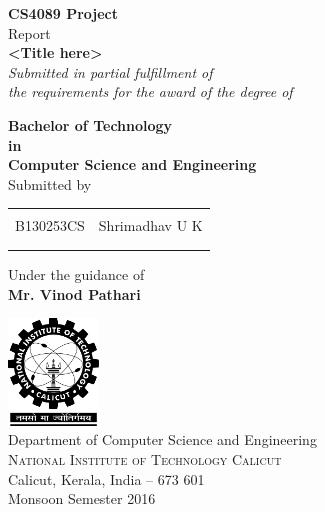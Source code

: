 \begin{titlepage}

\begin{center}

\textup{\small {\bf CS4089 Project} \\ Report}\\[0.2in]

\Large \textbf {<Title here>}\\[0.5in]

       \small \emph{Submitted in partial fulfillment of\\
        the requirements for the award of the degree of}
        \vspace{.2in}

       {\bf Bachelor of Technology \\in\\ Computer Science and Engineering}\\[0.5in]

\normalsize Submitted by \\
\begin{table}[h]
\centering
\begin{tabular}{lr}\hline \\
B130253CS & Shrimadhav U K \\ \\ \hline
\\
\end{tabular}
\end{table}

\vspace{.1in}
Under the guidance of\\
{\textbf{Mr. Vinod Pathari}}\\[0.2in]

\vfill

\includegraphics[width=0.18\textwidth]{./nitc-logo}\\[0.1in]
\Large{Department of Computer Science and Engineering}\\
\normalsize
\textsc{National Institute of Technology Calicut}\\
Calicut, Kerala, India -- 673 601 \\
\vspace{0.2cm}
Monsoon Semester 2016

\end{center}

\end{titlepage}
